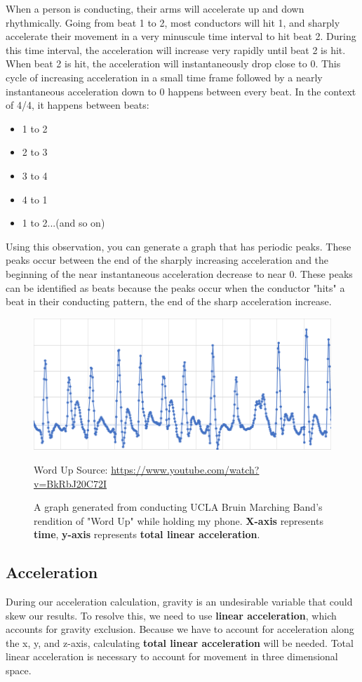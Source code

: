 \documentclass[12pt]{article}
\begin{document}
When a person is conducting, their arms will accelerate up and down rhythmically. Going from beat 1 to 2, most conductors will hit 1, and sharply accelerate their movement in a very minuscule time interval to hit beat 2. During this time interval, the acceleration will increase very rapidly until beat 2 is hit. When beat 2 is hit, the acceleration will instantaneously drop close to 0. This cycle of increasing acceleration in a small time frame followed by a nearly instantaneous acceleration down to 0 happens between every beat. In the context of 4/4, it happens between beats: 
\begin{itemize}
\item 1 to 2
\item 2 to 3
\item 3 to 4
\item 4 to 1
\item 1 to 2...(and so on)
\end{itemize}  

Using this observation, you can generate a graph that has periodic peaks. These peaks occur between the end of the sharply increasing acceleration and the beginning of the near instantaneous acceleration decrease to near 0. These peaks can be identified as beats because the peaks occur when the conductor "hits" a beat in their conducting pattern, the end of the sharp acceleration increase.

\begin{figure}[h!]
\begin{center}
\includegraphics[width=.75\textwidth]{graph1.png}
\caption{A graph generated from conducting UCLA Bruin Marching Band's rendition of "Word Up" while holding my phone. \textbf{X-axis} represents \textbf{time}, \textbf{y-axis} represents \textbf{total linear acceleration}.}
\tiny{Word Up Source: \href{https://www.youtube.com/watch?v=BkRbJ20C72I}{https://www.youtube.com/watch?v=BkRbJ20C72I}}
\label{fig:graph1}
\end{center}
\end{figure}

\subsection{Acceleration}
During our acceleration calculation, gravity is an undesirable variable that could skew our results. To resolve this, we need to use \textbf{linear acceleration}, which accounts for gravity exclusion. Because we have to account for acceleration along the x, y, and z-axis, calculating \textbf{total linear acceleration} will be needed. Total linear acceleration is necessary to account for movement in three dimensional space.
\end{document}

